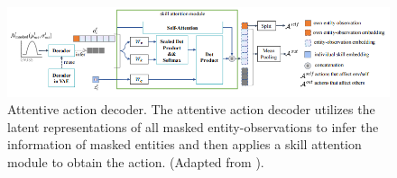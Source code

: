 \begin{figure}[H] 
    \centering
        \includegraphics[width=\linewidth]{img_pfe/MA2RL_att_decoder.PNG}
   
    
        \caption{Attentive action decoder. The attentive action decoder utilizes the latent representations of all masked entity-observations to infer the information of masked entities and then applies a skill attention module to obtain the action. (Adapted from \parencite{ma2rl}).}
        \label{fig:ma2rl_att_decoder}
\end{figure}



